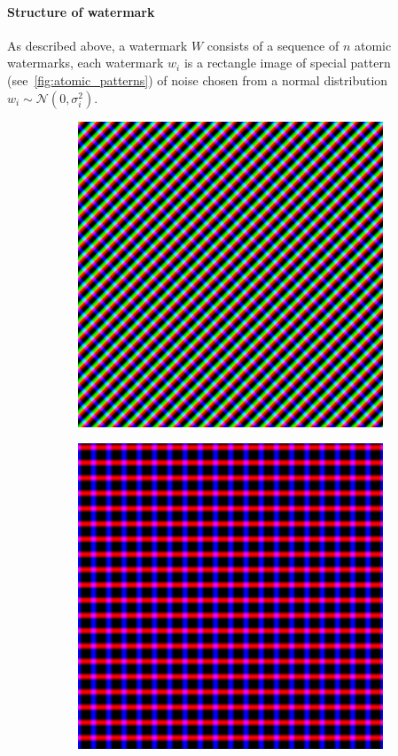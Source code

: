 \documentclass[a4paper,11pt,onecolumn]{memoir}
\begin{document}
\paragraph[Structure of watermark]{Structure of watermark}
As described above, a watermark $W$ consists of a sequence of $n$ atomic watermarks, each watermark $w_i$ is a rectangle image of special pattern (see~\autoref{fig:atomic_patterns}) of noise chosen from a normal distribution $w_i \sim \mathcal{N}(0, \sigma_i^2)$.
\begin{figure}[h]
    \centering
    \begin{subfigure}[b]{0.25\textwidth}
        \includegraphics[width=\textwidth]{w_inferix_0.png}
    \end{subfigure}
    \qquad
    \begin{subfigure}[b]{0.25\textwidth}
        \includegraphics[width=\textwidth]{w_inferix_1.png}

\end{subfigure}
\end{figure}
\end{document}
